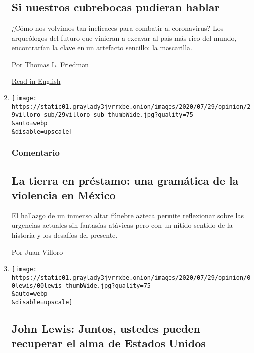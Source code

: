 \begin{enumerate}
  \hypertarget{si-nuestros-cubrebocas-pudieran-hablar}{%
  \subsection{Si nuestros cubrebocas pudieran
  hablar}\label{si-nuestros-cubrebocas-pudieran-hablar}}

  ¿Cómo nos volvimos tan ineficaces para combatir al coronavirus? Los
  arqueólogos del futuro que vinieran a excavar al país más rico del
  mundo, encontrarían la clave en un artefacto sencillo: la mascarilla.

  Por Thomas L. Friedman

  \href{https://www.nytimes3xbfgragh.onion/2020/07/28/opinion/coronavirus-masks.html}{Read
  in English}
\item
  \href{/es/2020/07/30/espanol/opinion/aztecas-violencia-narco-amlo.html}{}

  \texttt{[image: https://static01.graylady3jvrrxbe.onion/images/2020/07/29/opinion/29villoro-sub/29villoro-sub-thumbWide.jpg?quality=75\\\&auto=webp\\\&disable=upscale]}

  \hypertarget{comentario-8}{%
  \subsubsection{Comentario}\label{comentario-8}}

  \hypertarget{la-tierra-en-pruxe9stamo-una-gramuxe1tica-de-la-violencia-en-muxe9xico}{%
  \subsection{La tierra en préstamo: una gramática de la violencia en
  México}\label{la-tierra-en-pruxe9stamo-una-gramuxe1tica-de-la-violencia-en-muxe9xico}}

  El hallazgo de un inmenso altar fúnebre azteca permite reflexionar
  sobre las urgencias actuales sin fantasías atávicas pero con un nítido
  sentido de la historia y los desafíos del presente.

  Por Juan Villoro
\item
  \href{/es/2020/07/30/espanol/opinion/john-lewis-derechos-civiles.html}{}

  \texttt{[image: https://static01.graylady3jvrrxbe.onion/images/2020/07/29/opinion/00lewis/00lewis-thumbWide.jpg?quality=75\\\&auto=webp\\\&disable=upscale]}

  \hypertarget{john-lewis-juntos-ustedes-pueden-recuperar-el-alma-de-estados-unidos}{%
  \subsection{John Lewis: Juntos, ustedes pueden recuperar el alma de
  Estados
  Unidos}\label{john-lewis-juntos-ustedes-pueden-recuperar-el-alma-de-estados-unidos}}


\end{enumerate}
